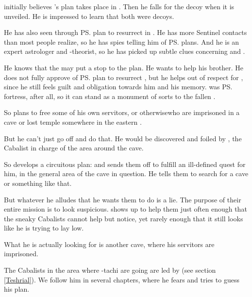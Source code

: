 \Ishnaruchaefir initially believes \Secherdamon's plan takes place in \Malcur.
Then he falls for the \Forclin decoy when it is unveiled. 
He is impressed to learn that both were decoys. 

He has also seen through \ps{\Secherdamon} plan to resurrect \Nithdornazsh{} in \Malcur. 
He has more Sentinel contacts than most people realize, so he has spies telling him of \ps{\Secherdamon} plans. 
And he is an expert astrologer and \matrix-theorist, so he has picked up subtle clues concerning \Nithdornazsh{} and \Malcur. 

He knows that the \noggyaleth{} may put a stop to the plan. 
He wants to help his brother.
He does not fully approve of \ps{\Secherdamon} plan to resurrect \Nithdornazsh, but he helps out of respect for , since he still feels guilt and obligation towards him and his memory. 
\Nithd{} was \ps{\Nexagglachel}{} fortress, after all, so it can stand as a monument of sorts to the fallen \dragonking.

So \Ishnaruchaefir{} plans to free some of his own servitors\dash\pdaemons, \dragons{} or otherwise\dash who are imprisoned in a cave or lost temple somewhere in the eastern \PelidorContinent. 

But he can't just go off and do that. He would be discovered and foiled by , the Cabalist in charge of the area around the cave. 

So \Ishnaruchaefir{} develops a circuitous plan: 
 and sends them off to fulfill an ill-defined quest for him, in the general area of the cave in question. He tells them to search for a cave or something like that. 

But whatever he alludes that he wants them to do is a lie. The purpose of their entire mission is to look suspicious. \Ishnaruchaefir{} shows up to help them just often enough that the sneaky Cabalists cannot help but notice, yet rarely enough that it still looks like he is trying to lay low. 

What he is actually looking for is another cave, where his servitors are imprisoned. 

The Cabalists in the area where \Shilred-tachi are going are led by \Teshrial{} (see section \ref{Teshrial}). We follow him in several chapters, where he fears \Ishnaruchaefir{} and tries to guess his plan. 






